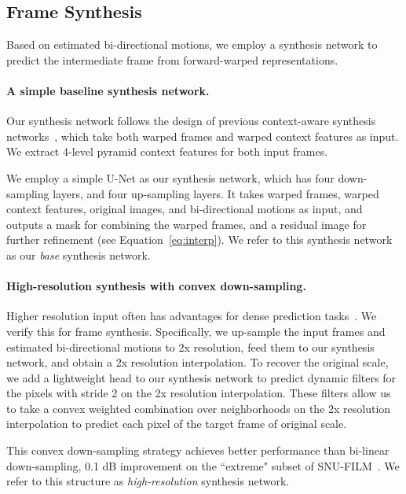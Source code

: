 \documentclass[10pt,twocolumn,letterpaper]{article}
\begin{document}
\subsection{Frame Synthesis}\label{subsec:our-synthesis}

Based on estimated bi-directional motions, we employ a synthesis network to
predict the intermediate frame from forward-warped representations.



\paragraph{A simple baseline synthesis network.} Our synthesis network follows
the design of previous context-aware synthesis
networks~\cite{niklaus2020softmax,huang2020rife}, which take both warped frames
and warped context features as input. We extract 4-level pyramid context
features for both input frames.


We employ a simple U-Net as our synthesis network, which has four down-sampling
layers, and four up-sampling layers. It takes warped frames, warped context
features, original images, and bi-directional motions as input, and outputs a
mask  for combining the warped frames, and a residual image  for
further refinement (see Equation~\ref{eq:interp}). We refer to this synthesis
network as our \textit{base} synthesis network.



\paragraph{High-resolution synthesis with convex down-sampling.} Higher
resolution input often has advantages for dense prediction
tasks~\cite{redmon2018yolov3,liu2021swin}. We verify this for frame synthesis.
Specifically, we up-sample the input frames and estimated bi-directional motions
to 2x resolution, feed them to our synthesis network, and obtain a 2x resolution
interpolation. To recover the original scale, we add a lightweight head to our
synthesis network to predict  dynamic filters for the pixels with
stride 2 on the 2x resolution interpolation. These filters allow us to take a
convex weighted combination over  neighborhoods on the 2x resolution
interpolation to predict each pixel of the target frame of original scale. 


This convex down-sampling strategy achieves better performance than bi-linear
down-sampling, 0.1 dB improvement on the ``extreme" subset of
SNU-FILM~\cite{choi2020channel}.  We refer to this structure as
\textit{high-resolution} synthesis network.
\end{document}
